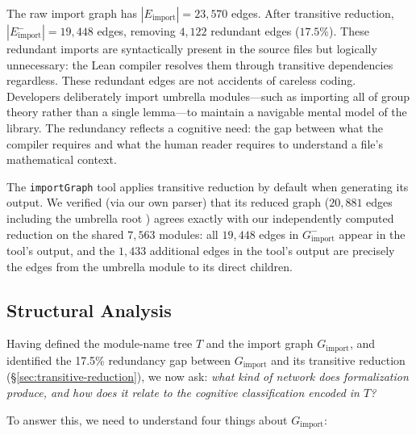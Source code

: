 The raw import graph has $|E_{\mathrm{import}}| = 23{,}570$ edges. After transitive reduction, $|E_{\mathrm{import}}^{-}| = 19{,}448$ edges, removing $4{,}122$ redundant edges ($17.5\%$). These redundant imports are syntactically present in the source files but logically unnecessary: the Lean compiler resolves them through transitive dependencies regardless. These redundant edges are not accidents of careless coding. Developers deliberately import umbrella modules---such as importing all of group theory rather than a single lemma---to maintain a navigable mental model of the library. The redundancy reflects a cognitive need: the gap between what the compiler requires and what the human reader requires to understand a file's mathematical context.

The \texttt{importGraph} tool applies transitive reduction by default when generating its output. We verified (via our own parser) that its reduced graph ($20{,}881$ edges including the umbrella root ) agrees exactly with our independently computed reduction on the shared $7{,}563$ modules: all $19{,}448$ edges in $G_{\mathrm{import}}^{-}$ appear in the tool's output, and the $1{,}433$ additional edges in the tool's output are precisely the edges from the umbrella module  to its direct children.

\subsection{Structural Analysis}
\label{sec:structural-analysis}

Having defined the module-name tree $T$ and the import graph $G_{\mathrm{import}}$, and identified the 17.5\% redundancy gap between $G_{\mathrm{import}}$ and its transitive reduction (\S\ref{sec:transitive-reduction}), we now ask: \emph{what kind of network does formalization produce, and how does it relate to the cognitive classification encoded in $T$?}

To answer this, we need to understand four things about $G_{\mathrm{import}}$:

